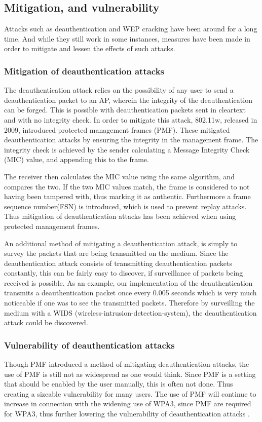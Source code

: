 \subsection{Mitigation, and vulnerability}
Attacks such as deauthentication and WEP cracking have been around for a long time. And while they still work in some instances, measures have been made in order to mitigate and lessen the effects of such attacks.

\subsubsection{Mitigation of deauthentication attacks}
The deauthentication attack relies on the possibility of any user to send a deauthentication packet to an AP, wherein the integrity of the deauthentication can be forged. This is possible with deauthentication packets sent in cleartext and with no integrity check. In order to mitigate this attack, 802.11w, released in 2009, introduced protected management frames (PMF). These mitigated deauthentication attacks by ensuring the integrity in the management frame. The integrity check is achieved by the sender calculating a Message Integrity Check (MIC) value, and appending this to the frame. 

The receiver then calculates the MIC value using the same algorithm, and compares the two. If the two MIC values match, the frame is considered to not having been tampered with, thus marking it as authentic. Furthermore a frame sequence number(FSN) is introduced, which is used to prevent replay attacks. \cite{IEEE_802.11w}
Thus mitigation of deauthentication attacks has been achieved when using protected management frames. 

An additional method of mitigating a deauthentication attack, is simply to survey the packets that are being transmitted on the medium. Since the deauthentication attack consists of transmitting deauthentication packets constantly, this can be fairly easy to discover, if surveillance of packets being received is possible. As an example, our implementation of the deauthentication transmits a deauthentication packet once every 0.005 seconds which is very much noticeable if one was to see the transmitted packets. Therefore by surveilling the medium with a WIDS (wireless-intrusion-detection-system), the deauthentication attack could be discovered.

\subsubsection{Vulnerability of deauthentication attacks}
Though PMF introduced a method of mitigating deauthentication attacks, the use of PMF is still not as widespread as one would think. Since PMF is a setting that should be enabled by the user manually, this is often not done. Thus creating a sizeable vulnerability for many users. The use of PMF will continue to increase in connection with the widening use of WPA3, since PMF are required for WPA3, thus further lowering the vulnerability of deauthentication attacks \cite{WPA3_info}\cite{wpa/pmf}. 

